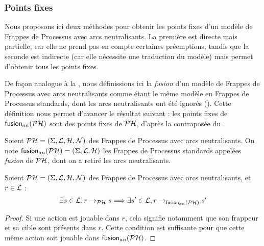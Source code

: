 
\subsubsection{Points fixes}

Nous proposons ici deux méthodes pour obtenir les points fixes d'un modèle de Frappes de Processus
avec arcs neutralisants.
La première est directe mais partielle, car elle ne prend pas en compte certaines préemptions,
tandis que la seconde est indirecte (car elle nécessite une traduction du modèle)
mais permet d'obtenir tous les points fixes.

\myskip

De façon analogue à la , nous définissions ici
la \emph{fusion} d'un modèle de Frappes de Processus avec arcs neutralisants
comme étant le même modèle en Frappes de Processus standards,
dont les arcs neutralisants ont été ignorés ().
Cette définition nous permet d'avancer le résultat suivant :
les points fixes de $\mathsf{fusion}_{an}(\mathcal{PH})$ sont des points fixes de $\mathcal{PH}$,
d'après la contraposée du .

\begin{definition}
  Soient $\mathcal{PH} = (\Sigma, \mathcal{L}, \mathcal{H}, \mathcal{N})$ des Frappes de Processus avec arcs neutralisants.
  On note $\mathsf{fusion}_{an}(\mathcal{PH}) = (\Sigma, \mathcal{L}, \mathcal{H})$
  les Frappes de Processus standards appelées \emph{fusion} de $\mathcal{PH}$,
  dont on a retiré les arcs neutralisants.
\end{definition}

\begin{theorem}
  Soient $\mathcal{PH} = (\Sigma, \mathcal{L}, \mathcal{H}, \mathcal{N})$ des Frappes de Processus avec arcs neutralisants,
  et $r \in \mathcal{L}$ :
  \[\exists s \in \mathcal{L}, r \rightarrow_{\mathcal{PH}} s \Longrightarrow
    \exists s' \in \mathcal{L}, r \rightarrow_{\mathsf{fusion}_{an}(\mathcal{PH})} s'\]
\end{theorem}

\begin{proof}
  Si une action est jouable dans $r$, cela signifie notamment
  que son frappeur et sa cible sont présents dans $r$.
  Cette condition est suffisante pour que cette même action soit jouable dans $\mathsf{fusion}_{an}(\mathcal{PH})$.
\end{proof}

